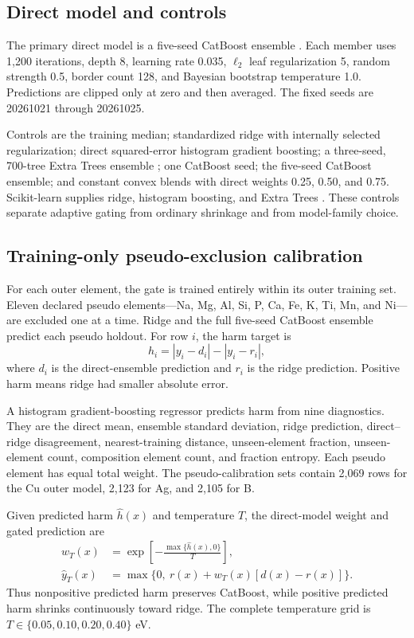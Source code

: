 \documentclass[11pt]{article}
\begin{document}
\subsection{Direct model and controls}
The primary direct model is a five-seed CatBoost ensemble
\citep{prokhorenkova2018catboost}. Each member uses 1,200 iterations, depth 8,
learning rate 0.035, $\ell_2$ leaf regularization 5, random strength 0.5, border
count 128, and Bayesian bootstrap temperature 1.0. Predictions are clipped only
at zero and then averaged. The fixed seeds are 20261021 through 20261025.

Controls are the training median; standardized ridge with internally selected
regularization; direct squared-error histogram gradient boosting; a three-seed,
700-tree Extra Trees ensemble \citep{geurts2006extremely}; one CatBoost seed;
the five-seed CatBoost ensemble; and constant convex blends with direct weights
0.25, 0.50, and 0.75. Scikit-learn supplies ridge, histogram boosting, and Extra
Trees \citep{pedregosa2011scikit}. These controls separate adaptive gating from
ordinary shrinkage and from model-family choice.

\subsection{Training-only pseudo-exclusion calibration}
For each outer element, the gate is trained entirely within its outer training
set. Eleven declared pseudo elements---Na, Mg, Al, Si, P, Ca, Fe, K, Ti, Mn,
and Ni---are excluded one at a time. Ridge and the full five-seed CatBoost
ensemble predict each pseudo holdout. For row $i$, the harm target is
\begin{equation}
 h_i = |y_i-d_i|-|y_i-r_i|,
\end{equation}
where $d_i$ is the direct-ensemble prediction and $r_i$ is the ridge prediction.
Positive harm means ridge had smaller absolute error.

A histogram gradient-boosting regressor predicts harm from nine diagnostics.
They are the direct mean, ensemble standard deviation, ridge prediction,
direct--ridge disagreement, nearest-training distance, unseen-element fraction,
unseen-element count, composition element count, and fraction entropy. Each
pseudo element has equal total weight. The pseudo-calibration sets contain 2,069 rows for the Cu
outer model, 2,123 for Ag, and 2,105 for B.

Given predicted harm $\widehat h(x)$ and temperature $T$, the direct-model
weight and gated prediction are
\begin{align}
 w_T(x) &= \exp\!\left[-\frac{\max\{\widehat h(x),0\}}{T}\right],\\
 \widehat y_T(x) &= \max\{0,\ r(x)+w_T(x)[d(x)-r(x)]\}.
\end{align}
Thus nonpositive predicted harm preserves CatBoost, while positive predicted
harm shrinks continuously toward ridge. The complete temperature grid is
$T\in\{0.05,0.10,0.20,0.40\}$ eV.
\end{document}
